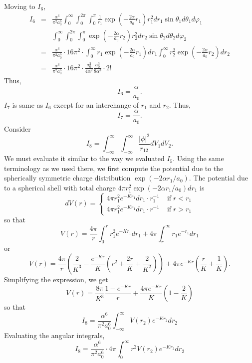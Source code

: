 \documentclass{article}
\numberwithin{equation}{section}
\begin{document}
Moving to $I_6$,
\begin{eqnarray*}
I_6 &=& \frac{\alpha^6}{\pi^2 a_0^6}
\int_0^\infty\int_0^{2\pi}\int_0^\pi
\frac{1}{r_1}\exp\left(-\frac{2\alpha}{a_0}r_1\right)
r_1^2dr_1\sin\theta_1d\theta_1d\varphi_1 \\
 & & 
\int_0^\infty\int_0^{2\pi}\int_0^\pi
\exp\left(-\frac{2\alpha}{a_0}r_2\right)
r_2^2dr_2\sin\theta_2d\theta_2d\varphi_2 \\
&=& \frac{\alpha^6}{\pi^2 a_0^6} \cdot 16\pi^2 \cdot
\int_0^\infty r_1\exp\left(-\frac{2\alpha}{a_0}r_1\right)dr_1
\int_0^\infty r_2^2\exp\left(-\frac{2\alpha}{a_0}r_2\right)dr_2 \\
&=& \frac{\alpha^6}{\pi^2 a_0^6} \cdot 16\pi^2 \cdot
\frac{a_0^2}{4\alpha^2}\frac{a_0^3}{8\alpha^3}\cdot 2!
\end{eqnarray*}
Thus,
\begin{equation}\label{s5e80}
I_6 = \frac{\alpha}{a_0}.
\end{equation}
$I_7$ is same as $I_6$ except for an interchange of $r_1$ and $r_2$. Thus,
\begin{equation}\label{s5e81}
I_7 = \frac{\alpha}{a_0}.
\end{equation}
Consider
\[
I_8 = \int_{-\infty}^\infty\int_{-\infty}^\infty\frac{|\phi|^2}{r_{12}}
dV_1 dV_2.
\]
We must evaluate it similar to the way we evaluated $I_5$. Using the same
terminology as we used there, we first compute the potential due to the
spherically symmetric charge distribution $\exp(-2\alpha r_1/a_0)$. The
potential due to a spherical shell with total charge $4\pi r_1^2 \exp(
-2\alpha r_1/a_0)dr_1$ is
\[
dV(r) = \begin{cases}
4\pi r_1^2e^{-Kr_1}dr_1 \cdot r_1^{-1} & \;\text{if}\; r < r_1 \\
4\pi r_1^2e^{-Kr_1}dr_1 \cdot r^{-1}   & \;\text{if}\; r > r_1
\end{cases}
\]
so that
\[
V(r) = \frac{4\pi}{r}\int_0^r r_1^2e^{-Kr_1}dr_1 + 
       4\pi\int_r^\infty r_1 e^{-r_1}dr_1
\]
or
\[
V(r) = \frac{4\pi}{r}\left(\frac{2}{K^3} - \frac{e^{-Kr}}{K}\left(r^2 +
\frac{2r}{K} + \frac{2}{K^2}\right)\right) + 4\pi e^{-Kr}\left(\frac{r}
{K} + \frac{1}{K}\right).
\]
Simplifying the expression, we get
\[
V(r) = \frac{8\pi}{K^3}\frac{1 - e^{-Kr}}{r} + \frac{4\pi e^{-Kr}}{K}
\left(1 - \frac{2}{K}\right)
\]
so that
\[
I_8 = \frac{\alpha^6}{\pi^2 a_0^6}\int_{-\infty}^\infty V(r_2)e^{-Kr_2}dr_2
\]
Evaluating the angular integrals,
\[
I_8 = \frac{\alpha^6}{\pi^2 a_0^6}\cdot 4\pi \int_0^\infty r^2
V(r_2)e^{-Kr_2}dr_2
\]
\end{document}
